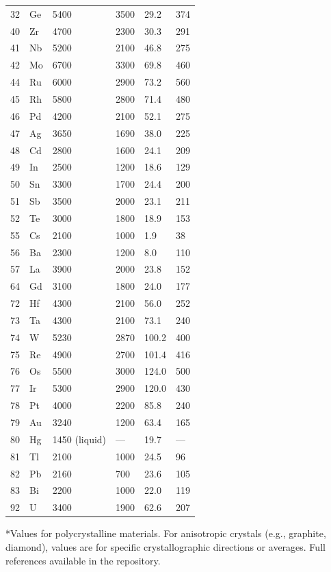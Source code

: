 \documentclass[12pt,a4paper]{article}
\begin{document}
\begin{longtable}{p{0.8cm}p{1.2cm}p{2.2cm}p{2.2cm}p{2.2cm}p{2.2cm}}
		32 & Ge & 5400 & 3500 & 29.2 & 374 \\
		40 & Zr & 4700 & 2300 & 30.3 & 291 \\
		41 & Nb & 5200 & 2100 & 46.8 & 275 \\
		42 & Mo & 6700 & 3300 & 69.8 & 460 \\
		44 & Ru & 6000 & 2900 & 73.2 & 560 \\
		45 & Rh & 5800 & 2800 & 71.4 & 480 \\
		46 & Pd & 4200 & 2100 & 52.1 & 275 \\
		47 & Ag & 3650 & 1690 & 38.0 & 225 \\
		48 & Cd & 2800 & 1600 & 24.1 & 209 \\
		49 & In & 2500 & 1200 & 18.6 & 129 \\
		50 & Sn & 3300 & 1700 & 24.4 & 200 \\
		51 & Sb & 3500 & 2000 & 23.1 & 211 \\
		52 & Te & 3000 & 1800 & 18.9 & 153 \\
		55 & Cs & 2100 & 1000 & 1.9 & 38 \\
		56 & Ba & 2300 & 1200 & 8.0 & 110 \\
		57 & La & 3900 & 2000 & 23.8 & 152 \\
		64 & Gd & 3100 & 1800 & 24.0 & 177 \\
		72 & Hf & 4300 & 2100 & 56.0 & 252 \\
		73 & Ta & 4300 & 2100 & 73.1 & 240 \\
		74 & W  & 5230 & 2870 & 100.2 & 400 \\
		75 & Re & 4900 & 2700 & 101.4 & 416 \\
		76 & Os & 5500 & 3000 & 124.0 & 500 \\
		77 & Ir & 5300 & 2900 & 120.0 & 430 \\
		78 & Pt & 4000 & 2200 & 85.8 & 240 \\
		79 & Au & 3240 & 1200 & 63.4 & 165 \\
		80 & Hg & 1450 (liquid) & --- & 19.7 & --- \\
		81 & Tl & 2100 & 1000 & 24.5 & 96 \\
		82 & Pb & 2160 & 700 & 23.6 & 105 \\
		83 & Bi & 2200 & 1000 & 22.0 & 119 \\
		92 & U  & 3400 & 1900 & 62.6 & 207 \\
		\bottomrule
	\end{longtable}
	*Values for polycrystalline materials. For anisotropic crystals (e.g., graphite, diamond), values are for specific crystallographic directions or averages. Full references available in the repository.
	
\end{document}
